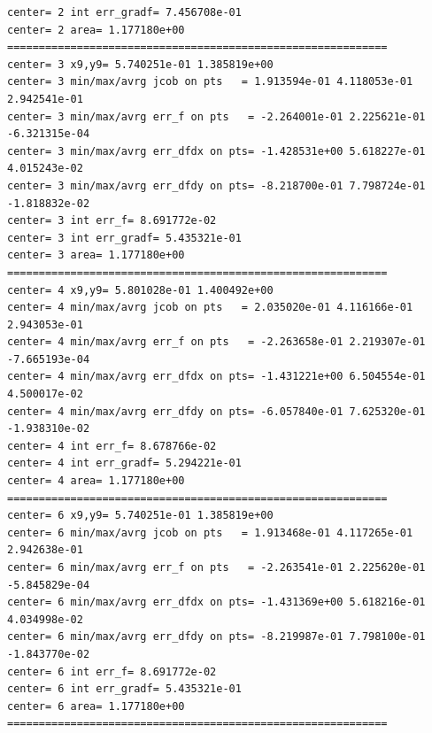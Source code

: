 \begin{tiny}
\begin{verbatim}
center= 2 int err_gradf= 7.456708e-01
center= 2 area= 1.177180e+00
============================================================
center= 3 x9,y9= 5.740251e-01 1.385819e+00 
center= 3 min/max/avrg jcob on pts   = 1.913594e-01 4.118053e-01 2.942541e-01
center= 3 min/max/avrg err_f on pts   = -2.264001e-01 2.225621e-01 -6.321315e-04
center= 3 min/max/avrg err_dfdx on pts= -1.428531e+00 5.618227e-01 4.015243e-02
center= 3 min/max/avrg err_dfdy on pts= -8.218700e-01 7.798724e-01 -1.818832e-02
center= 3 int err_f= 8.691772e-02
center= 3 int err_gradf= 5.435321e-01
center= 3 area= 1.177180e+00
============================================================
center= 4 x9,y9= 5.801028e-01 1.400492e+00 
center= 4 min/max/avrg jcob on pts   = 2.035020e-01 4.116166e-01 2.943053e-01
center= 4 min/max/avrg err_f on pts   = -2.263658e-01 2.219307e-01 -7.665193e-04
center= 4 min/max/avrg err_dfdx on pts= -1.431221e+00 6.504554e-01 4.500017e-02
center= 4 min/max/avrg err_dfdy on pts= -6.057840e-01 7.625320e-01 -1.938310e-02
center= 4 int err_f= 8.678766e-02
center= 4 int err_gradf= 5.294221e-01
center= 4 area= 1.177180e+00
============================================================
center= 6 x9,y9= 5.740251e-01 1.385819e+00 
center= 6 min/max/avrg jcob on pts   = 1.913468e-01 4.117265e-01 2.942638e-01
center= 6 min/max/avrg err_f on pts   = -2.263541e-01 2.225620e-01 -5.845829e-04
center= 6 min/max/avrg err_dfdx on pts= -1.431369e+00 5.618216e-01 4.034998e-02
center= 6 min/max/avrg err_dfdy on pts= -8.219987e-01 7.798100e-01 -1.843770e-02
center= 6 int err_f= 8.691772e-02
center= 6 int err_gradf= 5.435321e-01
center= 6 area= 1.177180e+00
============================================================
\end{verbatim}
\end{tiny}

